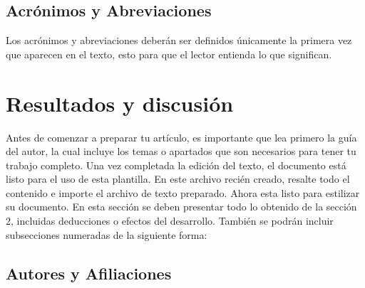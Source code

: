 \subsection{Acrónimos y Abreviaciones}

Los acrónimos y abreviaciones deberán ser definidos únicamente la primera vez que aparecen en el texto, esto para que el lector entienda lo que significan.


% 
% 

\section{Resultados y discusión}

Antes de comenzar a preparar tu artículo, es importante que lea primero la guía del autor, la cual incluye los temas o apartados que son necesarios para tener tu trabajo completo.
Una vez completada la edición del texto, el documento está listo para el uso de esta plantilla. En este archivo recién creado, resalte todo el contenido e importe el archivo de texto preparado. Ahora esta listo para estilizar su documento.
En esta sección se deben presentar todo lo obtenido de la sección 2, incluidas deducciones o efectos del desarrollo. También se podrán incluir subsecciones numeradas de la siguiente forma:

\subsection{Autores y Afiliaciones}

